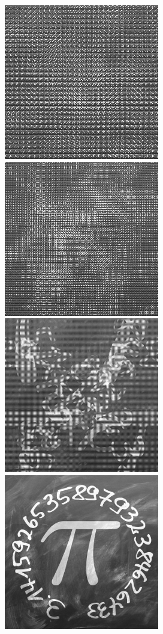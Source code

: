 \documentclass[12pt,class=report,crop=false]{standalone}
\begin{document}
\begin{center}
\includegraphics[scale=0.3]{images_fiche/pi_gimp_new_photo_5.png}\qquad
\includegraphics[scale=0.3]{images_fiche/pi_gimp_new_photo_6.png}\qquad
\includegraphics[scale=0.3]{images_fiche/pi_gimp_new_photo_7.png}\qquad
\includegraphics[scale=0.3]{images_fiche/pi_gimp_new_photo_8.png}
\end{center}
\end{document}
